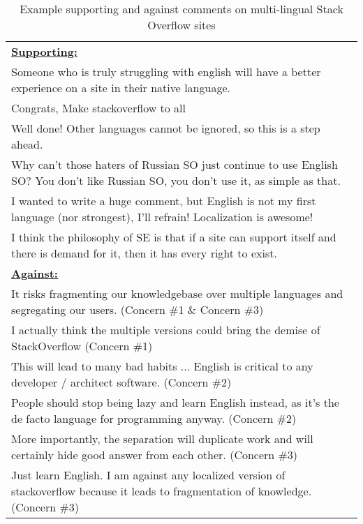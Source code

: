 \begin{table}
	\caption{Example supporting and against comments on multi-lingual Stack Overflow sites}
	\scriptsize
	\label{tab:comments}
	\begin{tabular}{l}
		\hline
		 \underline{\textbf{Supporting:}} \\ 
		 Someone who is truly struggling with english will have a better experience on a site in their native language. \\
		Congrats, Make stackoverflow to all\\
		Well done! Other languages cannot be ignored, so this is a step ahead. \\
		Why can't those haters of Russian SO just continue to use English SO? You don't like Russian SO, you don't use it, as simple as that. \\
		I wanted to write a huge comment, but English is not my first language (nor strongest), I'll refrain! Localization is awesome! \\
		I think the philosophy of SE is that if a site can support itself and there is demand for it, then it has every right to exist. \\
		\hline
		
		\underline{\textbf{Against:}} \\
		 It risks fragmenting our knowledgebase over multiple languages and segregating our users.  (Concern \#1 \& Concern \#3)\\
		 I actually think the multiple versions could bring the demise of StackOverflow (Concern \#1)\\
		 This will lead to many bad habits ... English is critical to any developer / architect software. (Concern \#2)\\
		 People should stop being lazy and learn English instead, as it's the de facto language for programming anyway. (Concern \#2)\\
		 More importantly, the separation will duplicate work and will certainly hide good answer from each other. (Concern \#3) \\
		 Just learn English. I am against any localized version of stackoverflow because it leads to fragmentation of knowledge. (Concern \#3)\\
		\hline
	\end{tabular}
\end{table}

